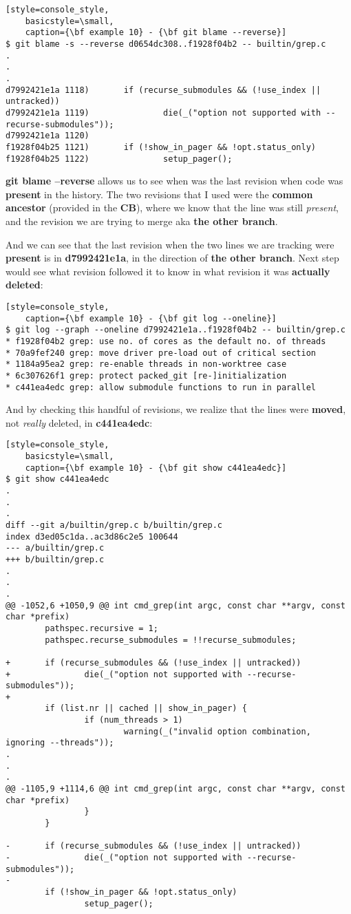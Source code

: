 \begin{lstlisting}[style=console_style,
	basicstyle=\small,
	caption={\bf example 10} - {\bf git blame --reverse}]
$ git blame -s --reverse d0654dc308..f1928f04b2 -- builtin/grep.c
.
.
.
d7992421e1a 1118)       if (recurse_submodules && (!use_index || untracked))
d7992421e1a 1119)               die(_("option not supported with --recurse-submodules"));
d7992421e1a 1120) 
f1928f04b25 1121)       if (!show_in_pager && !opt.status_only)
f1928f04b25 1122)               setup_pager();
\end{lstlisting}
{\bf git blame --reverse} allows us to see when was the last revision when code was {\bf present} in the history. The two
revisions that I used were the {\bf common ancestor} (provided in the {\bf CB}), where we know that the line was still
{\it present},  and the revision we are trying to merge aka {\bf the other branch}.

And we can see that the last revision when the two lines we are tracking were {\bf present} is in {\bf d7992421e1a},
in the direction of {\bf the other branch}. Next step would see what revision followed it to know in what revision it
was {\bf actually deleted}:

\begin{lstlisting}[style=console_style,
	caption={\bf example 10} - {\bf git log --oneline}]
$ git log --graph --oneline d7992421e1a..f1928f04b2 -- builtin/grep.c
* f1928f04b2 grep: use no. of cores as the default no. of threads
* 70a9fef240 grep: move driver pre-load out of critical section
* 1184a95ea2 grep: re-enable threads in non-worktree case
* 6c307626f1 grep: protect packed_git [re-]initialization
* c441ea4edc grep: allow submodule functions to run in parallel
\end{lstlisting}

And by checking this handful of revisions, we realize that the lines were {\bf moved}, not {\it really} deleted,
in {\bf c441ea4edc}:

\begin{lstlisting}[style=console_style,
	basicstyle=\small,
	caption={\bf example 10} - {\bf git show c441ea4edc}]
$ git show c441ea4edc
.
.
.
diff --git a/builtin/grep.c b/builtin/grep.c
index d3ed05c1da..ac3d86c2e5 100644
--- a/builtin/grep.c
+++ b/builtin/grep.c
.
.
.
@@ -1052,6 +1050,9 @@ int cmd_grep(int argc, const char **argv, const char *prefix)
        pathspec.recursive = 1;
        pathspec.recurse_submodules = !!recurse_submodules;
 
+       if (recurse_submodules && (!use_index || untracked))
+               die(_("option not supported with --recurse-submodules"));
+
        if (list.nr || cached || show_in_pager) {
                if (num_threads > 1)
                        warning(_("invalid option combination, ignoring --threads"));
.
.
.
@@ -1105,9 +1114,6 @@ int cmd_grep(int argc, const char **argv, const char *prefix)
                }
        }
 
-       if (recurse_submodules && (!use_index || untracked))
-               die(_("option not supported with --recurse-submodules"));
-
        if (!show_in_pager && !opt.status_only)
                setup_pager();
 
\end{lstlisting}

